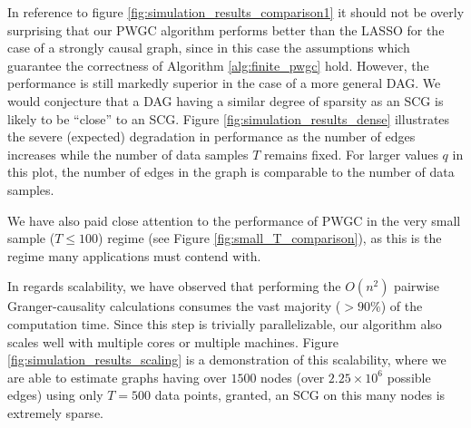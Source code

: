 \documentclass[12pt]{article}
\begin{document}
In reference to figure \ref{fig:simulation_results_comparison1} it
should not be overly surprising that our PWGC algorithm performs
better than the LASSO for the case of a strongly causal graph, since
in this case the assumptions which guarantee the correctness of
Algorithm \ref{alg:finite_pwgc} hold.  However, the performance is
still markedly superior in the case of a more general DAG.  We would
conjecture that a DAG having a similar degree of sparsity as an SCG is
likely to be ``close'' to an SCG.  Figure
\ref{fig:simulation_results_dense} illustrates the severe (expected)
degradation in performance as the number of edges increases while
the number of data samples $T$ remains fixed.  For larger values $q$
in this plot, the number of edges in the graph is comparable to the
number of data samples.

We have also paid close attention to the performance of PWGC in the
very small sample ($T \le 100$) regime (see Figure
\ref{fig:small_T_comparison}), as this is the regime many applications
must contend with.

In regards scalability, we have observed that performing the $O(n^2)$
pairwise Granger-causality calculations consumes the vast majority
($> 90\%$) of the computation time.  Since this step is trivially
parallelizable, our algorithm also scales well with multiple cores or
multiple machines.  Figure \ref{fig:simulation_results_scaling} is a
demonstration of this scalability, where we are able to estimate
graphs having over $1500$ nodes (over $2.25 \times 10 ^6$ possible edges)
using only $T = 500$ data points, granted, an SCG on this many nodes
is extremely sparse.
\end{document}
